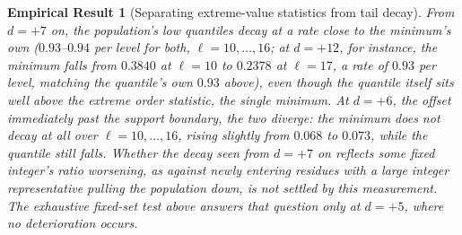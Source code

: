 \documentclass[11pt]{article}
\newtheorem{empirical}[theorem]{Empirical Result}
\theoremstyle{remark}
\begin{document}
\begin{empirical}[Separating extreme-value statistics from tail decay]
From $d=+7$ on, the population's low quantiles decay at
a rate close to the minimum's own ($0.93$--$0.94$ per level for both,
$\ell=10,\ldots,16$; at $d=+12$, for instance, the minimum falls from
$0.3840$ at $\ell=10$ to $0.2378$ at $\ell=17$, a rate of $0.93$ per
level, matching the quantile's own $0.93$ above), even though the
quantile itself sits well above the extreme order statistic, the
single minimum. At $d=+6$, the offset immediately past the support
boundary, the two diverge: the minimum does not decay at all over
$\ell=10,\ldots,16$, rising slightly from $0.068$ to $0.073$, while
the quantile still falls. Whether the decay seen from $d=+7$ on
reflects some fixed integer's
ratio worsening, as against newly entering residues with a large
integer representative pulling the population down, is not settled by this
measurement. The exhaustive fixed-set test above answers that question
only at $d=+5$, where no deterioration occurs.
\end{empirical}
\end{document}
